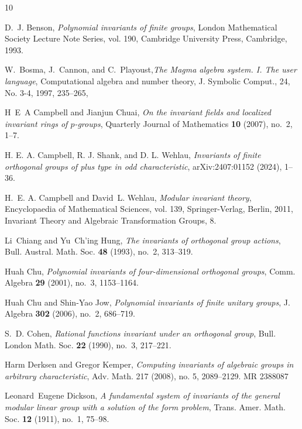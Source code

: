 \documentclass{amsart}
\begin{document}
\begin{thebibliography}{10}

D.~J. Benson, \emph{Polynomial invariants of finite groups}, London
  Mathematical Society Lecture Note Series, vol. 190, Cambridge University
  Press, Cambridge, 1993. 

W.~Bosma, J.~Cannon, and C.~Playoust,\emph{The Magma algebra system. I. The user language},
Computational algebra and number theory, J. Symbolic Comput., 24, No. 3-4, 1997, 235--265,

H~E~A Campbell and Jianjun Chuai, \emph{On the invariant fields and localized
  invariant rings of $p$-groups}, Quarterly Journal of Mathematics \textbf{10}
  (2007), no.~2, 1--7. 


H. E. A. Campbell, R. J. Shank, and D. L. Wehlau, \emph{Invariants of finite orthogonal groups of
plus type in odd characteristic}, arXiv:2407:01152 (2024), 1–36.


H.~E. A. Campbell and David~L. Wehlau, \emph{Modular invariant theory},
  Encyclopaedia of Mathematical Sciences, vol. 139, Springer-Verlag, Berlin,
  2011, Invariant Theory and Algebraic Transformation Groups, 8. 


Li~Chiang and Yu~Ch'ing Hung, \emph{The invariants of orthogonal group
  actions}, Bull. Austral. Math. Soc. \textbf{48} (1993), no.~2, 313--319.

Huah Chu, \emph{Polynomial invariants of four-dimensional orthogonal groups},
  Comm. Algebra \textbf{29} (2001), no.~3, 1153--1164. 

Huah Chu and Shin-Yao Jow, \emph{Polynomial invariants of finite unitary
  groups}, J. Algebra \textbf{302} (2006), no.~2, 686--719. 

S.~D. Cohen, \emph{Rational functions invariant under an orthogonal group},
  Bull. London Math. Soc. \textbf{22} (1990), no.~3, 217--221. 

  
  Harm Derksen and Gregor Kemper, \emph{Computing invariants of algebraic groups in arbitrary
characteristic}, Adv. Math. 217 (2008), no. 5, 2089–2129. MR 2388087

Leonard~Eugene Dickson, \emph{A fundamental system of invariants of the general
  modular linear group with a solution of the form problem}, Trans. Amer. Math.
  Soc. \textbf{12} (1911), no.~1, 75--98. 




\end{thebibliography}
\end{document}

